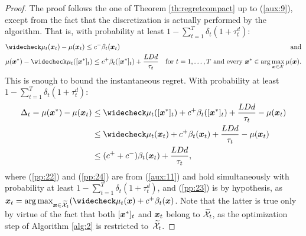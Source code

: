 \documentclass{article}
\begin{document}
\regretdiscretized*
\begin{proof}
	The proof follows the one of Theorem \ref{th:regretcompact} up to (\ref{aux:9}), except from the fact that the discretization is actually performed by the algorithm. That is, with probability at least $1-\sum_{t=1}^{T}\delta_t(1+\tau_t^d)$:
	\begin{align}
		&\wc{\mu}_t(\vx_t) - \mu(\vx_t) \leq c^{-}\beta_t(\vx_t) &\text{and}\nonumber\\
		&\mu(\vx^*) - \wc{\mu}_t([\vx^*]_t) \leq c^{+}\beta_t([\vx^*]_t) + \frac{LDd}{\tau_t}
		&\text{for $t=1,\dots,T$ and every $\vx^*\in\arg\max_{\vx\in\Xspace}\mu(\vx)$.}\label{aux:11}
	\end{align}
	This is enough to bound the instantaneous regret. With probability at least $1-\sum_{t=1}^{T}\delta_t(1+\tau_t^d)$:
	\begin{align}
		\Delta_t = \mu(\vx^*) - \mu(\vx_t) 
		&\leq \wc{\mu}_t([\vx^*]_t) + c^{+}\beta_t([\vx^*]_t) + \frac{LDd}{\tau_t} - \mu(\vx_t) \label{pp:23}\\
		&\leq \wc{\mu}_t(\vx_t) + c^{+}\beta_t(\vx_t) + \frac{LDd}{\tau_t} - \mu(\vx_t) \label{pp:24}\\
		&\leq (c^{+}+c^{-})\beta_t(\vx_t) + \frac{LDd}{\tau_t}, \label{aux:12}
	\end{align}
	where (\ref{pp:22}) and (\ref{pp:24}) are from (\ref{aux:11}) and hold simultaneously with probability at least $1-\sum_{t=1}^{T}\delta_t(1+\tau_t^d)$, and (\ref{pp:23}) is by hypothesis, as $\vx_t = \arg\max_{\vx\in\wt{\Xspace}_t}(\wc{\mu}_t(\vx) + c^{+}\beta_t(\vx)$. Note that the latter is true only by virtue of the fact that both $[\boldsymbol{x}^*]_t$ and $\boldsymbol{x}_t$ belong to $\widetilde{\mathcal{X}}_t$, as the optimization step of Algorithm \ref{alg:2} is restricted to~$\widetilde{\mathcal{X}}_t$.
	

\end{proof}
\end{document}
